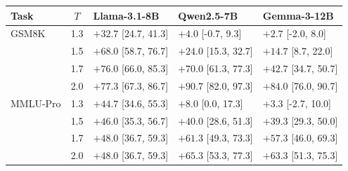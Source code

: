 \begin{tabular}{lclll}
\toprule
Task & $T$ & Llama-3.1-8B & Qwen2.5-7B & Gemma-3-12B \\
\midrule
GSM8K & 1.3 & $+32.7$ [24.7, 41.3] & $+4.0$ [-0.7, 9.3] & $+2.7$ [-2.0, 8.0] \\
 & 1.5 & $+68.0$ [58.7, 76.7] & $+24.0$ [15.3, 32.7] & $+14.7$ [8.7, 22.0] \\
 & 1.7 & $+76.0$ [66.0, 85.3] & $+70.0$ [61.3, 77.3] & $+42.7$ [34.7, 50.7] \\
 & 2.0 & $+77.3$ [67.3, 86.7] & $+90.7$ [82.0, 97.3] & $+84.0$ [76.0, 90.7] \\
\midrule
MMLU-Pro & 1.3 & $+44.7$ [34.6, 55.3] & $+8.0$ [0.0, 17.3] & $+3.3$ [-2.7, 10.0] \\
 & 1.5 & $+46.0$ [35.3, 56.7] & $+40.0$ [28.6, 51.3] & $+39.3$ [29.3, 50.0] \\
 & 1.7 & $+48.0$ [36.7, 59.3] & $+61.3$ [49.3, 73.3] & $+57.3$ [46.0, 69.3] \\
 & 2.0 & $+48.0$ [36.7, 59.3] & $+65.3$ [53.3, 77.3] & $+63.3$ [51.3, 75.3] \\
\bottomrule
\end{tabular}
